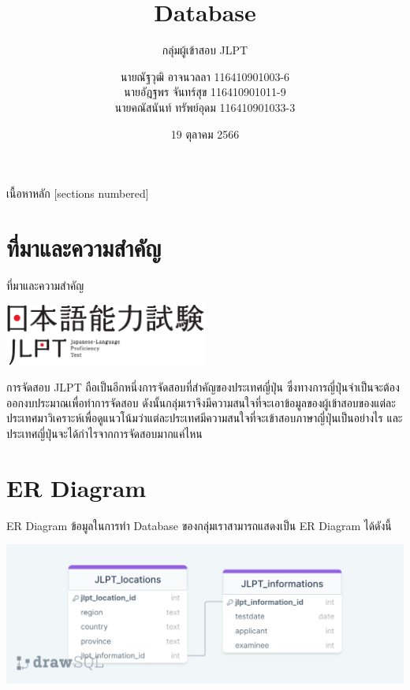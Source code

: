 \documentclass{beamer}
\title{Database }
\subtitle{กลุ่มผู้เข้าสอบ JLPT}
\date{19 ตุลาคม 2566}
\author{นายณัฐวุฒิ อาจนวลลา 116410901003-6 \\
นายอัฎฐพร จันทร์สุข 116410901011-9 \\
นายคณัสนันท์ ทรัพย์อุดม 116410901033-3 }
\institute{มหาวิทยาลัยเทคโนโลยีราชมงคลธัญบุรี}
\begin{document}
\begin{frame}
  \titlepage
\end{frame}

\begin{frame}{เนื้อหาหลัก}
  [sections numbered]
  \tableofcontents[hideallsubsections]
\end{frame}

\section{ที่มาและความสำคัญ}

\begin{frame}{ที่มาและความสำคัญ}
  \begin{center}
  \includegraphics[width=0.5\textwidth]{jlpt.png}
  \end{center}
  \vfill
  การจัดสอบ JLPT ถือเป็นอีกหนึ่งการจัดสอบที่สำคัญของประเทศญี่ปุ่น ซึ่งทางการญี่ปุ่นจำเป็นจะต้องออกงบประมาณเพื่อทำการจัดสอบ ดังนั้นกลุ่มเราจึงมีความสนใจที่จะเอาข้อมูลของผู้เข้าสอบของแต่ละประเทศมาวิเคราะห์เพื่อดูแนวโน้มว่าแต่ละประเทศมีความสนใจที่จะเข้าสอบภาษาญี่ปุ่นเป็นอย่างไร และประเทศญี่ปุ่นจะได้กำไรจากการจัดสอบมากแค่ไหน 
\end{frame}

\section{ER Diagram}

\begin{frame}{ER Diagram}
  ข้อมูลในการทำ Database ของกลุ่มเราสามารถแสดงเป็น ER Diagram ได้ดังนี้
  \vfill
  \begin{center}
  \includegraphics[scale=0.25]{Real_picture.png}
  \end{center} 
\end{frame}
\end{document}
